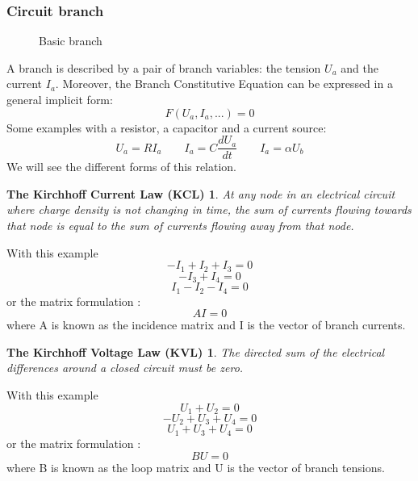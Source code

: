 \frame
{
  \frametitle{Circuit branch}
\begin{figure}[h]
\centerline{
 \scalebox{0.4}{
    
 }
}
\caption{Basic branch}
\end{figure}
A branch is described by a pair of branch variables: the tension $U_{a}$ and the current $I_{a}$.
Moreover, the Branch Constitutive Equation can be expressed in a general implicit form:
\begin{equation}\label{BCE}F(U_{a},I_{a},...)=0\end{equation}
Some examples with a resistor, a capacitor and a current source:
\[U_{a}=RI_{a} \qquad I_{a}=C\frac{dU_{a}}{dt} \qquad I_{a}=\alpha U_{b}\]
We will see the different forms of this relation.
  }

\frame
{
\newtheorem{kcl}{The Kirchhoff Current Law (KCL)}
\begin{kcl}
At any node in an electrical circuit where charge density is not changing in time, the sum of
currents flowing towards that node is equal to the sum of currents flowing away from that node.
\end{kcl}
\begin{figure}[h]
\centerline{
 \scalebox{0.35}{
    
 }
}
\end{figure}
With this example 
\[-I_{1}+I_{2}+I_{3}=0\]
\[-I_{3}+I_{4}=0\]
\[I_{1}-I_{2}-I_{4}=0\]
or the matrix formulation :
\[AI=0\]
where A is known as the incidence matrix and I is the vector of branch currents.

}
\frame
{
\newtheorem{kvl}{The Kirchhoff Voltage Law (KVL)}
\begin{kvl}
The directed sum of the electrical differences around a closed circuit must be zero.
\end{kvl}
\begin{figure}[h]
\centerline{
 \scalebox{0.35}{
    
 }
}
\end{figure}
With this example 
\[U_{1}+U_{2}=0\]
\[ -U_{2}+U_{3}+U_{4}=0\]
\[ U_{1}+U_{3}+U_{4}=0\]
or the matrix formulation :
\[BU=0\]
where B is known as the loop matrix and U is the vector of branch tensions.
}

